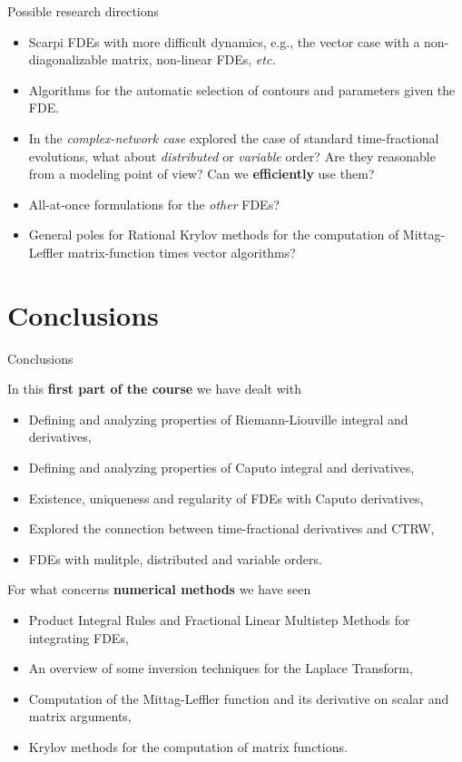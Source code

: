 \documentclass[aspectratio=169,xcolor=dvipsnames]{beamer}
\begin{document}
\begin{frame}{\faBinoculars\;Possible research directions}

\begin{itemize}
\item[\faBinoculars]<1-> Scarpi FDEs with more difficult dynamics, e.g., the vector case with a non-diagonalizable matrix, non-linear FDEs, \emph{etc.}
\item[\faBinoculars]<2-> Algorithms for the automatic selection of contours and parameters given the FDE.
\item[\faBinoculars]<3-> In the \emph{complex-network case} \cite{DIAZDIAZ2022111791} explored the case of standard time-fractional evolutions, what about \emph{distributed} or \emph{variable} order? Are they reasonable from a modeling point of view? Can we \textbf{efficiently} use them?
\item[\faBinoculars]<4-> All-at-once formulations for the \emph{other} FDEs?
\item[\faBinoculars]<5-> General poles for Rational Krylov methods for the computation of Mittag-Leffler matrix-function times vector algorithms?
\end{itemize}

\end{frame}

\section{Conclusions}

\begin{frame}{Conclusions}

In this \alert{\textbf{first part of the course}} we have dealt with
\begin{itemize}
\item[\faCog] Defining and analyzing properties of Riemann-Liouville integral and derivatives,
\item[\faCog] Defining and analyzing properties of Caputo integral and derivatives,
\item[\faCog] Existence, uniqueness and regularity of FDEs with Caputo derivatives,
\item[\faCog] Explored the connection between time-fractional derivatives and CTRW,
\item[\faCog] FDEs with mulitple, distributed and variable orders.
\end{itemize}
For what concerns \alert{\textbf{numerical methods}} we have seen
\begin{itemize}
\item[\faWrench] Product Integral Rules and Fractional Linear Multistep Methods for integrating FDEs,
\item[\faWrench] An overview of some inversion techniques for the Laplace Transform,
\item[\faWrench] Computation of the Mittag-Leffler function and its derivative on scalar and matrix arguments,
\item[\faWrench] Krylov methods for the computation of matrix functions.
\end{itemize}

\end{frame}
\end{document}

